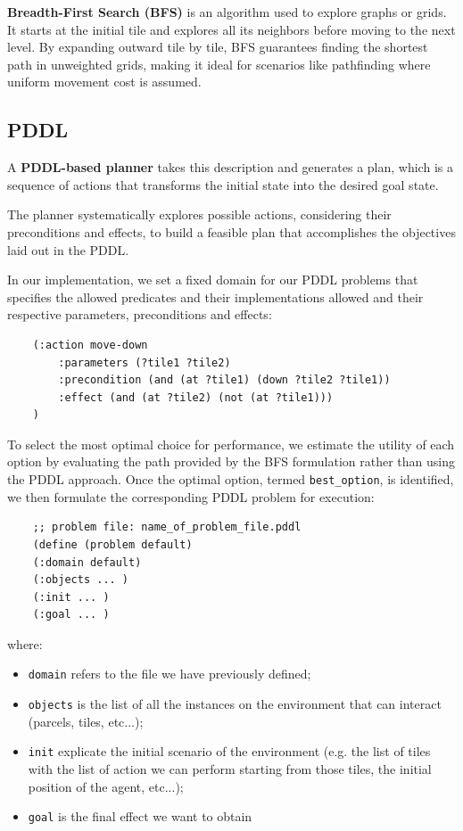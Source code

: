 \documentclass[10pt]{article}
\begin{document}
\textbf{Breadth-First Search (BFS)} is an algorithm used to explore graphs or grids. It starts at the initial tile and explores all its neighbors before moving to the next level. By expanding outward tile by tile, BFS guarantees finding the shortest path in unweighted grids, making it ideal for scenarios like pathfinding where uniform movement cost is assumed.

\subsection{PDDL}

A \textbf{PDDL-based planner} takes this description and generates a plan, which is a sequence of actions that transforms the initial state into the desired goal state. 

The planner systematically explores possible actions, considering their preconditions and effects, to build a feasible plan that accomplishes the objectives laid out in the PDDL.

In our implementation, we set a fixed domain for our PDDL problems that specifies the allowed predicates and their implementations allowed and their respective parameters, preconditions and effects:

\begin{verbatim}
    (:action move-down
        :parameters (?tile1 ?tile2)
        :precondition (and (at ?tile1) (down ?tile2 ?tile1))
        :effect (and (at ?tile2) (not (at ?tile1)))
    )
\end{verbatim}

To select the most optimal choice for performance, we estimate the utility of each option by evaluating the path provided by the BFS formulation rather than using the PDDL approach. Once the optimal option, termed \texttt{best\_option}, is identified, we then formulate the corresponding PDDL problem for execution:

\begin{verbatim}
    ;; problem file: name_of_problem_file.pddl
    (define (problem default)
    (:domain default)
    (:objects ... )
    (:init ... )
    (:goal ... ) 
\end{verbatim}

where:

\begin{itemize}
    \item \texttt{domain} refers to the file we have previously defined;
    \item  \texttt{objects} is the list of all the instances on the environment that can interact (parcels, tiles, etc...);
    \item \texttt{init} explicate the initial scenario of the environment (e.g. the list of tiles with the list of action we can perform starting from those tiles, the initial position of the agent, etc...);
    \item \texttt{goal} is the final effect we want to obtain 
\end{itemize}
\end{document}
